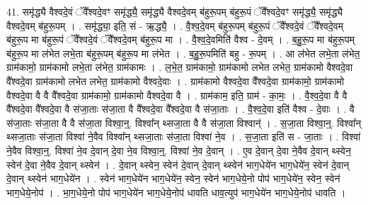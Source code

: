 \documentclass[17pt]{extarticle}
\begin{document}
41. समृ॑द्ध्यै वैश्वदे॒वं ॅवै᳚श्वदे॒वꣳ समृ॑द्ध्यै॒ समृ॑द्ध्यै वैश्वदे॒वम् ब॑हुरू॒पम् ब॑हुरू॒पं ॅवै᳚श्वदे॒वꣳ समृ॑द्ध्यै॒ समृ॑द्ध्यै वैश्वदे॒वम् ब॑हुरू॒पम् । . समृ॑द्ध्या॒ इति॒ सं - ऋ॒द्ध्यै॒ । . वै॒श्व॒दे॒वम् ब॑हुरू॒पम् ब॑हुरू॒पं ॅवै᳚श्वदे॒वं ॅवै᳚श्वदे॒वम् ब॑हुरू॒प मा ब॑हुरू॒पं ॅवै᳚श्वदे॒वं ॅवै᳚श्वदे॒वम् ब॑हुरू॒प मा । . वै॒श्व॒दे॒वमिति॑ वैश्व - दे॒वम् । . ब॒हु॒रू॒प मा ब॑हुरू॒पम् ब॑हुरू॒प मा ल॑भेत लभे॒ता ब॑हुरू॒पम् ब॑हुरू॒प मा ल॑भेत । . ब॒हु॒रू॒पमिति॑ बहु - रू॒पम् । . आ ल॑भेत लभे॒ता ल॑भेत॒ ग्राम॑कामो॒ ग्राम॑कामो लभे॒ता ल॑भेत॒ ग्राम॑कामः । . ल॒भे॒त॒ ग्राम॑कामो॒ ग्राम॑कामो लभेत लभेत॒ ग्राम॑कामो वैश्वदे॒वा वै᳚श्वदे॒वा ग्राम॑कामो लभेत लभेत॒ ग्राम॑कामो वैश्वदे॒वाः । . ग्राम॑कामो वैश्वदे॒वा वै᳚श्वदे॒वा ग्राम॑कामो॒ ग्राम॑कामो वैश्वदे॒वा वै वै वै᳚श्वदे॒वा ग्राम॑कामो॒ ग्राम॑कामो वैश्वदे॒वा वै । . ग्राम॑काम॒ इति॒ ग्राम॑ - का॒मः॒ । . वै॒श्व॒दे॒वा वै वै वै᳚श्वदे॒वा वै᳚श्वदे॒वा वै स॑जा॒ताः स॑जा॒ता वै वै᳚श्वदे॒वा वै᳚श्वदे॒वा वै स॑जा॒ताः । . वै॒श्व॒दे॒वा इति॑ वैश्व - दे॒वाः । . वै स॑जा॒ताः स॑जा॒ता वै वै स॑जा॒ता विश्वा॒न्॒. विश्वा᳚न् थ्सजा॒ता वै वै स॑जा॒ता विश्वान्॑ । . स॒जा॒ता विश्वा॒न्॒. विश्वा᳚न् थ्सजा॒ताः स॑जा॒ता विश्वा॑ ने॒वैव विश्वा᳚न् थ्सजा॒ताः स॑जा॒ता विश्वा॑ ने॒व । . स॒जा॒ता इति॑ स - जा॒ताः । . विश्वा॑ ने॒वैव विश्वा॒न्॒. विश्वा॑ ने॒व दे॒वान् दे॒वा ने॒व विश्वा॒न्॒. विश्वा॑ ने॒व दे॒वान् । . ए॒व दे॒वान् दे॒वा ने॒वैव दे॒वान् थ्स्वेन॒ स्वेन॑ दे॒वा ने॒वैव दे॒वान् थ्स्वेन॑ । . दे॒वान् थ्स्वेन॒ स्वेन॑ दे॒वान् दे॒वान् थ्स्वेन॑ भाग॒धेये॑न भाग॒धेये॑न॒ स्वेन॑ दे॒वान् दे॒वान् थ्स्वेन॑ भाग॒धेये॑न । . स्वेन॑ भाग॒धेये॑न भाग॒धेये॑न॒ स्वेन॒ स्वेन॑ भाग॒धेये॒नो पोप॑ भाग॒धेये॑न॒ स्वेन॒ स्वेन॑ भाग॒धेये॒नोप॑ । . भा॒ग॒धेये॒नो पोप॑ भाग॒धेये॑न भाग॒धेये॒नोप॑ धावति धाव॒त्युप॑ भाग॒धेये॑न भाग॒धेये॒नोप॑ धावति । \newline
\end{document}
